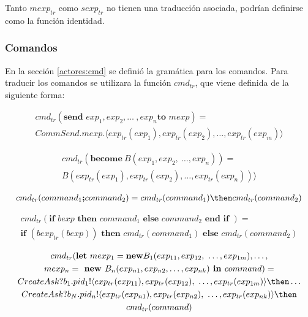 Tanto $mexp_{tr}$ como $sexp_{tr}$ no tienen una traducción asociada, podrían definirse como la función identidad.

\subsubsection*{Comandos}

En la sección \ref{actores:cmd} se definió la gramática para los comandos. Para traducir los comandos se utilizara la función $cmd_{tr}$, que viene definida de la siguiente forma:

\begin{multline*}
cmd_{tr} (\textbf{send } exp_1, exp_2, \ldots\ , exp_n \textbf{to } mexp) = \\
CommSend.mexp. \langle exp_{tr}(exp_1), exp_{tr}(exp_2), \ldots, exp_{tr}(exp_m) \rangle
\end{multline*}

\begin{multline*}
cmd_{tr} (\textbf{become}\ B(exp_1, exp_2,\ \ldots, exp_n)) = \\
B(exp_{tr}(exp_1), exp_{tr}(exp_2), \ldots, exp_{tr}(exp_n)) \rangle
\end{multline*}

\begin{multline*}
cmd_{tr} (command_1 \textbf{;} command_2) = cmd_{tr}(command_1) \then cmd_{tr}(command_2)
\end{multline*}

\begin{multline*}
cmd_{tr} (\textbf{if } bexp \textbf{ then } command_1 \textbf{ else } command_2 \textbf{ end if }) = \\
\textbf{if } (bexp_{tr}(bexp))\textbf{ then } cmd_{tr}(command_1) \textbf{ else } cmd_{tr}(command_2)
\end{multline*}

\begin{multline*}
cmd_{tr}( \textbf{let}\ mexp_1 = \textbf{new} B_1(exp_{11}, exp_{12},\ \ldots, exp_{1m}), \ldots, \\
mexp_n = \textbf{ new }B_n(exp_{n1}, exp_{n2},\ldots, exp_{nk}) \textbf{ in }command) = \\
CreateAsk?b_1.pid_1! \langle exp_{tr}(exp_{11}), exp_{tr}(exp_{12}),\ \ldots, exp_{tr}(exp_{1m}) \rangle \then \ldots \\
CreateAsk?b_N.pid_n! \langle exp_{tr}(exp_{n1}), exp_{tr}(exp_{n2}),\ \ldots, exp_{tr}(exp_{nk}) \rangle \then  \\ 
cmd_{tr}(command)
\end{multline*}

